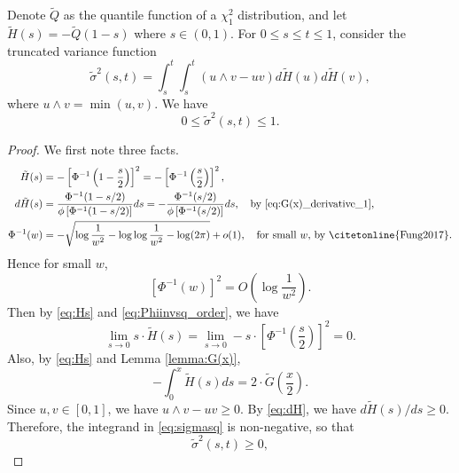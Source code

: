 \begin{lemma}
	\label{lemma:sigmasq}
	Denote $\tilde{Q}$ as the quantile function of a $\chi_1^2$ distribution, and let $\tilde{H}(s) = -\tilde{Q}(1-s)$ where $s\in (0,1)$. For $0\le s \le t \le 1$, consider the truncated variance function
	\begin{equation}
	\tilde{\sigma}^2(s,t) = \int_{s}^{t} \int_{s}^{t} (u \wedge v -uv) d \tilde{H}(u) d \tilde{H}(v),
	\label{eq:sigmasq}
	\end{equation}
	where $u \wedge v =\min(u,v)$. We have
	\begin{equation*}
	0 \le \tilde{\sigma}^2(s,t) \le 1.
	\end{equation*}
\end{lemma}
\begin{proof}
	We first note three facts.
	\begin{align}
	\tilde{H}(s) &= -\left[\Phi^{-1}\left(1-\frac{s}{2}\right) \right]^2=-\left[\Phi^{-1}\left(\frac{s}{2}\right) \right]^2,\label{eq:Hs} \\
	d\tilde{H}(s) &= \frac{\Phi^{-1}(1-s/2)}{\phi\left[\Phi^{-1}(1-s/2)\right]}ds=-\frac{\Phi^{-1}(s/2)}{\phi\left[\Phi^{-1}(s/2)\right]}ds, \quad \text{by \eqref{eq:G(x)_derivative_1}},\label{eq:dH} \\
	\Phi^{-1}(w) &= -\sqrt{\log\frac{1}{w^2} - \log\log\frac{1}{w^2} - \log(2\pi)} + o(1), \quad \text{for small $w$, by \citetonline{Fung2017}}. \label{eq:Phiinv_order}
	\end{align}
	Hence for small $w$,
	\begin{equation}
	\label{eq:Phiinvsq_order}
	\left[\Phi^{-1}(w)\right]^2 = O\left(\log \frac{1}{w^2}\right).
	\end{equation}
	Then by \eqref{eq:Hs} and \eqref{eq:Phiinvsq_order}, we have
	\begin{equation}
	\label{eq:sHs_limit}
	\lim_{s \to 0} s\cdot \tilde{H}(s) = \lim_{s \to 0} -s\cdot \left[\Phi^{-1}\left(\frac{s}{2}\right)\right]^2 = 0.
	\end{equation}
	Also, by \eqref{eq:Hs} and Lemma \ref{lemma:G(x)},
	\begin{equation}
	\label{eq:Hs_integral}
	-\int_{0}^{x} \tilde{H}(s) ds =  2\cdot \tilde{G}\left(\frac{x}{2}\right).
	\end{equation}
	Since $u,v\in[0,1]$, we have $u \wedge v-uv \ge 0$. By \eqref{eq:dH}, we have $d\tilde{H}(s)/ds \ge 0$. Therefore, the integrand in \eqref{eq:sigmasq} is non-negative, so that
	\begin{equation*}
	\tilde{\sigma}^2(s,t) \ge 0,

\end{equation*}
\end{proof}

